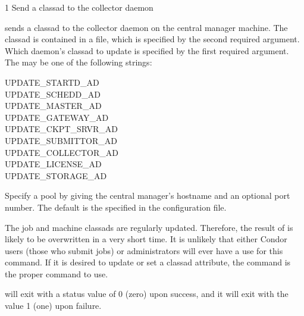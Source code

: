 \begin{ManPage}{\label{man-condor-advertise}}{1}
{Send a classad to the collector daemon}
\Synopsis {}
\ToolArgsBase
{}


\Description
{} sends a classad to the collector daemon on
the central manager machine.
The classad is contained in a file,
which is specified by the second required argument.
Which daemon's classad to update is specified by the first
required argument.
The  may be one of the following strings:
\begin{description}
\item[UPDATE\_STARTD\_AD]
\item[UPDATE\_SCHEDD\_AD]
\item[UPDATE\_MASTER\_AD]
\item[UPDATE\_GATEWAY\_AD]
\item[UPDATE\_CKPT\_SRVR\_AD]
\item[UPDATE\_SUBMITTOR\_AD]
\item[UPDATE\_COLLECTOR\_AD]
\item[UPDATE\_LICENSE\_AD]
\item[UPDATE\_STORAGE\_AD]
\end{description}

\begin{Options}
    \ToolArgsBaseDesc
            {Specify a pool by
            giving the central manager's hostname and an optional port
	    number.  The default is the
	     specified in the configuration file.}
\end{Options}

\GenRem
The job and machine classads are regularly updated.
Therefore, the result of  is likely to be
overwritten in a very short time.
It is unlikely that either Condor users (those who submit jobs)
or administrators will ever have a use for this command.
If it is desired to update or set a classad attribute, the
 command is the proper command to use.

\ExitStatus

 will exit with a status value of 0 (zero) upon success,
and it will exit with the value 1 (one) upon failure.

\end{ManPage}
